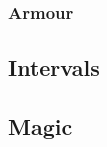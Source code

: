 \begin{multicols}{2}
\subsubsection*{Armour}



\commonArmourChart

\subsection*{Intervals}



\subsection*{Magic}



\end{multicols}
